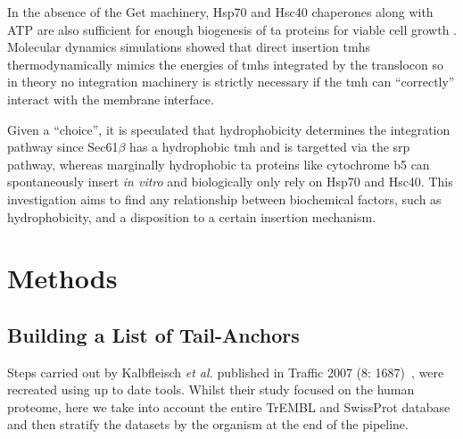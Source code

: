 In the absence of the Get machinery, Hsp70 and Hsc40 chaperones along with ATP are also sufficient for enough biogenesis of \gls{ta} proteins for viable cell growth \cite{Rabu2008, Rabu2009, Ngosuwan2003}.
Molecular dynamics simulations showed that direct insertion \gls{tmh}s thermodynamically mimics the energies of \gls{tmh}s integrated by the translocon \cite{Ulmschneider2014} so in theory no integration machinery is strictly necessary if the \gls{tmh} can ``correctly'' interact with the membrane interface.

Given a ``choice'', it is speculated that hydrophobicity determines the integration pathway since Sec61$\beta$ has a hydrophobic \gls{tmh} and is targetted via the \gls{srp} pathway, whereas marginally hydrophobic \gls{ta} proteins like cytochrome b5 can spontaneously insert \textit{in vitro} and biologically only rely on Hsp70 and Hsc40.
This investigation aims to find any relationship between biochemical factors, such as hydrophobicity, and a disposition to a certain insertion mechanism.









\section{Methods}

\subsection{Building a List of Tail-Anchors}
Steps carried out by Kalbfleisch \textit{et al.} published in Traffic 2007 (8: 1687)~\cite{Kalbfleisch2007}, were recreated using up to date tools.
Whilst their study focused on the human proteome, here we take into account the entire TrEMBL and SwissProt database and then stratify the datasets by the organism at the end of the pipeline.

